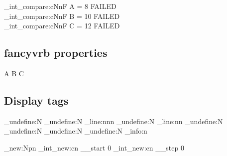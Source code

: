 \ExplSyntaxOn
\CDR_int_compare:cNnF { A } = 8 { FAILED \\ }
\CDR_int_compare:cNnF { B } = {10} { FAILED \\ }
\CDR_int_compare:cNnF { C } = {12} { FAILED \\ }
\ExplSyntaxOff

\subsection{\textsf{fancyvrb} properties}

\begin{CDRBlock} [
  tags=none,
  numbers=left,
  firstnumber=last,
]
A
B
C
\end{CDRBlock}

\newpage

\subsection{Display tags}

\makeatletter
\ExplSyntaxOn

\cs_undefine:N \CDR@Line
\cs_undefine:N \CDR_line:nnn
\cs_undefine:N \CDR_line:nn
\cs_undefine:N \CDR@NumberFormat
\cs_undefine:N \CDR@TagsFormat
\cs_undefine:N \CDR@NumberSep
\cs_undefine:N \CDR_info:n

\cs_new:Npn \CDR@Line {
  \peek_meaning_ignore_spaces:NTF [ { \CDR_line:nnn } { \CDR_line:nn }
}
\CDR_int_new:cn { __start } { 0 }
\CDR_int_new:cn { __step }  { 0 }

